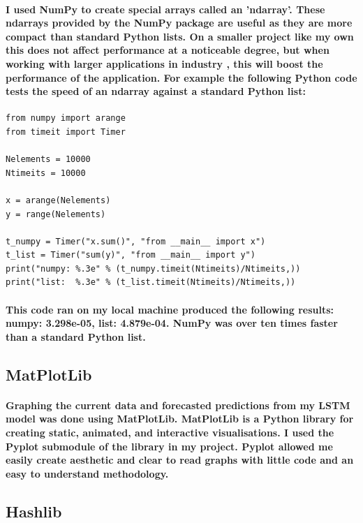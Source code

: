 \paragraph{I used NumPy to create special arrays called an 'ndarray'. These ndarrays provided by the NumPy package are useful as they are more compact than standard Python lists. On a smaller project like my own this does not affect performance at a noticeable degree, but when working with larger applications in industry , this will boost the performance of the application. For example the following Python code\cite{numpyspeed} tests the speed of an ndarray against a standard Python list: }


\begin{verbatim}
from numpy import arange
from timeit import Timer

Nelements = 10000
Ntimeits = 10000

x = arange(Nelements)
y = range(Nelements)

t_numpy = Timer("x.sum()", "from __main__ import x")
t_list = Timer("sum(y)", "from __main__ import y")
print("numpy: %.3e" % (t_numpy.timeit(Ntimeits)/Ntimeits,))
print("list:  %.3e" % (t_list.timeit(Ntimeits)/Ntimeits,))
\end{verbatim}

\paragraph{This code ran on my local machine produced the following results: numpy: 3.298e-05, list: 4.879e-04. NumPy was over ten times faster than a standard Python list.}

\subsection{MatPlotLib}
\paragraph{Graphing the current data and forecasted predictions from my LSTM model was done using MatPlotLib. MatPlotLib is a Python library for creating static, animated, and interactive visualisations. I used the Pyplot submodule of the library in my project. Pyplot allowed me easily create aesthetic and clear to read graphs with little code and an easy to understand methodology.}

\subsection{Hashlib}
